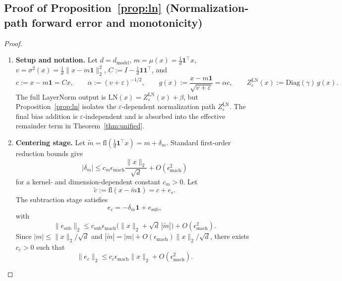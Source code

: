 \documentclass[twoside]{article}
\theoremstyle{definition}
\theoremstyle{remark}
\begin{document}
\subsection{Proof of Proposition~\ref{prop:ln} (Normalization-path forward error and monotonicity)}
\label{app:ln-proof}

\begin{proof}
\phantom{.}
\begin{enumerate}
  \item \textbf{Setup and notation.}
  Let $d=d_{\text{model}}$, $m=\mu(x)=\tfrac{1}{d}\mathbf{1}^\top x$,
  $v=\sigma^2(x)=\tfrac{1}{d}\|x-m\mathbf{1}\|_2^2$,
  $C:=I-\tfrac{1}{d}\mathbf{1}\mathbf{1}^\top$, and
  \[
  c:=x-m\mathbf{1}=Cx,\qquad
  \alpha:=(v+\varepsilon)^{-1/2},\qquad
  g(x):=\frac{x-m\mathbf{1}}{\sqrt{v+\varepsilon}}=\alpha c,
  \qquad
  Z^{\mathrm{LN}}_\varepsilon(x):=\mathrm{Diag}(\gamma)\,g(x).
  \]
  The full LayerNorm output is $\mathrm{LN}(x)=Z^{\mathrm{LN}}_\varepsilon(x)+\beta$,
  but Proposition~\ref{prop:ln} isolates the $\varepsilon$-dependent normalization
  path $Z^{\mathrm{LN}}_\varepsilon$. The final bias addition is
  $\varepsilon$-independent and is absorbed into the effective remainder term in
  Theorem~\ref{thm:unified}.

  \item \textbf{Centering stage.}
  Let $\widetilde{m}=\mathrm{fl}(\tfrac{1}{d}\mathbf{1}^\top x)=m+\delta_m$.
  Standard first-order reduction bounds give
  \[
  |\delta_m|
  \le
  c_m\epsilon_{\mathrm{mach}}\frac{\|x\|_2}{\sqrt d}
  + O(\epsilon_{\mathrm{mach}}^2)
  \]
  for a kernel- and dimension-dependent constant $c_m>0$. Let
  \[
  \widetilde{c}:=\mathrm{fl}(x-\widetilde{m}\mathbf{1})=c+e_c.
  \]
  The subtraction stage satisfies
  \[
  e_c=-\delta_m\mathbf{1}+e_{\mathrm{sub}},
  \]
  with
  \[
  \|e_{\mathrm{sub}}\|_2
  \le
  c_{\mathrm{sub}}\epsilon_{\mathrm{mach}}
  \bigl(\|x\|_2+\sqrt d\,|\widetilde{m}|\bigr)
  + O(\epsilon_{\mathrm{mach}}^2).
  \]
  Since $|m|\le \|x\|_2/\sqrt d$ and
  $|\widetilde{m}|=|m|+O(\epsilon_{\mathrm{mach}})\|x\|_2/\sqrt d$, there exists
  $c_c>0$ such that
  \[
  \|e_c\|_2
  \le
  c_c\epsilon_{\mathrm{mach}}\|x\|_2
  + O(\epsilon_{\mathrm{mach}}^2).
  \]


\end{enumerate}
\end{proof}
\end{document}
